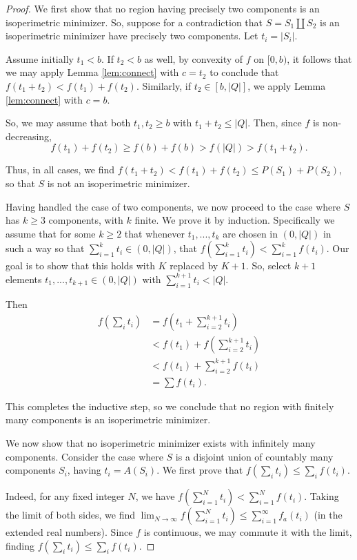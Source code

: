 \documentclass[leqno]{article}
\numberwithin{equation}{section}
\theoremstyle{definition}
\theoremstyle{remark}
\theoremstyle{plain}
\begin{document}
\begin{proof}  We first show that no region having precisely two components is an isoperimetric minimizer.  So, suppose for a contradiction that $S = S_1 \coprod S_2$ is an isoperimetric minimizer have precisely two components.  Let $t_i = |S_i|$.

Assume initially $t_1 < b$.  If $t_2< b$ as well, by convexity of $f$ on $[0,b)$, it follows that we may apply Lemma \ref{lem:connect} with $c = t_2$ to conclude that $f(t_1 + t_2) < f(t_1) + f(t_2)$.  Similarly, if $t_2\in [b,|Q|]$, we apply Lemma \ref{lem:connect} with $c = b$.

So, we may assume that both $t_1,t_2 \geq b$ with $t_1+t_2\leq |Q|$.  Then, since $f$ is non-decreasing, $$f(t_1) + f(t_2) \geq f(b) + f(b) > f(|Q|) > f(t_1 + t_2).$$

Thus, in all cases, we find $f(t_1 + t_2) < f(t_1) + f(t_2) \leq P(S_1) + P(S_2)$, so that $S$ is not an isoperimetric minimizer.

Having handled the case of two components, we now proceed to the case where $S$ has $k\geq 3$ components, with $k$ finite.  We prove it by induction.  Specifically we assume that for some $k\geq 2$ that whenever $t_1,..., t_k$ are chosen in $(0,|Q|)$ in such a way so that $\sum_{i=1}^k t_i \in (0, |Q|)$, that $f\left( \sum_{i=1}^k t_i\right) < \sum_{i=1}^{k} f(t_i)$.   Our goal is to show that this holds with $K$ replaced by $K+1$.  So, select $k+1$ elements $t_1,..., t_{k+1}\in (0,|Q|)$ with $\sum_{i=1}^{k+1} t_i < |Q|$.

Then \begin{align*} f\left(\sum_i t_i\right) &= f\left(t_1 + \sum_{i=2}^{k+1} t_i\right)\\
&< f(t_1) + f\left(\sum_{i=2}^{k+1} t_i\right)\\
& < f(t_1) + \sum_{i=2}^{k+1} f(t_i)\\
&= \sum f(t_i).\end{align*}

This completes the inductive step, so we conclude that no region with finitely many components is an isoperimetric minimizer.

We now show that no isoperimetric minimizer exists with infinitely many components.  Consider the case where $S$ is a disjoint union of countably many components $S_i$, having $t_i = A(S_i)$.  We first prove that $f(\sum_i t_i) \leq \sum_i f(t_i)$.

Indeed, for any fixed integer $N$, we have $f\left(\sum_{i=1}^N t_i\right) < \sum_{i=1}^N f(t_i)$.  Taking the limit of both sides, we find $\lim_{N\rightarrow\infty} f\left(\sum_{i=1}^N t_i\right) \leq \sum_{i=1}^\infty f_a(t_i)$ (in the extended real numbers).  Since $f$ is continuous, we may commute it with the limit, finding $f\left(\sum_i t_i\right) \leq \sum_i f(t_i)$.


\end{proof}
\end{document}
